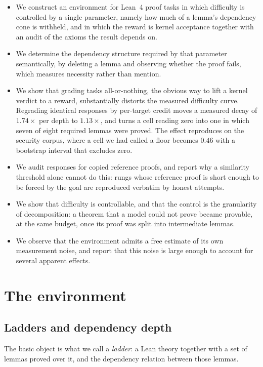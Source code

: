 \documentclass[11pt]{article}
\begin{document}
\begin{itemize}
\item We construct an environment for Lean~4 proof tasks in which difficulty is
controlled by a single parameter, namely how much of a lemma's dependency cone
is withheld, and in which the reward is kernel acceptance together with an audit
of the axioms the result depends on.
\item We determine the dependency structure required by that parameter
semantically, by deleting a lemma and observing whether the proof fails, which
measures necessity rather than mention.
\item We show that grading tasks all-or-nothing, the obvious way to lift a
kernel verdict to a reward, substantially distorts the measured difficulty
curve. Regrading identical responses by per-target credit moves a measured decay
of $1.74\times$ per depth to $1.13\times$, and turns a cell reading zero into one
in which seven of eight required lemmas were proved. The effect reproduces on the
security corpus, where a cell we had called a floor becomes $0.46$ with a
bootstrap interval that excludes zero.
\item We audit responses for copied reference proofs, and report why a
similarity threshold alone cannot do this: rungs whose reference proof is short
enough to be forced by the goal are reproduced verbatim by honest attempts.
\item We show that difficulty is controllable, and that the control is the
granularity of decomposition: a theorem that a model could not prove became
provable, at the same budget, once its proof was split into intermediate lemmas.
\item We observe that the environment admits a free estimate of its own
measurement noise, and report that this noise is large enough to account for
several apparent effects.
\end{itemize}

\section{The environment}

\subsection{Ladders and dependency depth}

The basic object is what we call a \emph{ladder}: a Lean theory together with a
set of lemmas proved over it, and the dependency relation between those lemmas.
\end{document}
